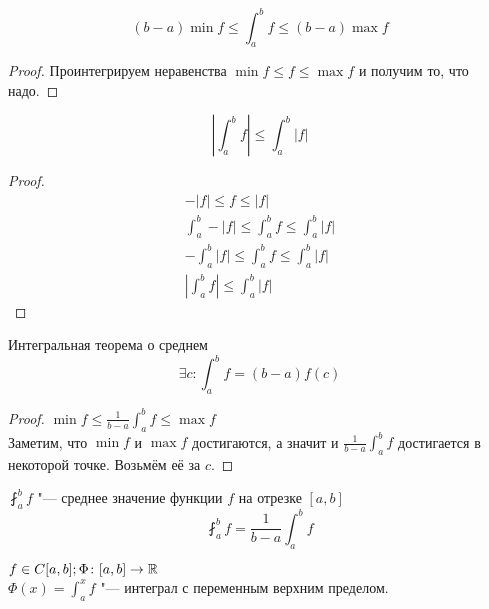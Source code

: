 \begin{conseq}
	\[ (b - a)\min f \le \int_a^b f \le (b - a)\max f \]
\end{conseq}
\begin{proof}
	Проинтегрируем неравенства $\min f \le f \le \max f$ и получим то, что надо.
\end{proof}
\begin{conseq}
	\[\left| \int_a^b f \right| \le \int_a^b |f|\]
\end{conseq}
\begin{proof}
	\begin{gather*}
		 -|f| \le f \le |f| \\
		 \int_a^b -|f| \le \int_a^b f \le \int_a^b |f| \\
		 -\int_a^b |f| \le \int_a^b f \le \int_a^b |f| \\
		 \left|\int_a^b f \right| \le \int_a^b |f|
	 \end{gather*}
\end{proof}

\begin{conseq}{Интегральная теорема о среднем}
	\[\exists c\colon \int_a^b f = (b - a)f(c)\]
\end{conseq}
\begin{proof}
	$\min f \le \frac{1}{b - a} \int_a^b f \le \max f$\\
	Заметим, что $\min f$ и $\max f$ достигаются, а значит и $\frac{1}{b - a} \int_a^b f$ достигается в некоторой точке. Возьмём её за $c$.
\end{proof}

\begin{Def}
	$\fint_a^b f$ "--- среднее значение функции $f$ на отрезке $[a, b]$\\
	\[\fint_a^b f = \frac{1}{b - a} \int_a^b f\]
\end{Def}

\begin{Def}
	$f \in C[a, b]; \Phi \colon [a, b] \rightarrow \mathbb{R}$ \\
	$\Phi (x) = \int_a^x f$ "--- интеграл с переменным верхним пределом.
\end{Def}

